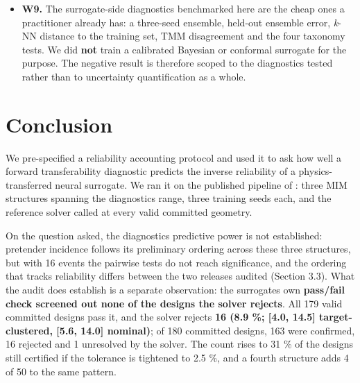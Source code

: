 \documentclass[11pt,a4paper]{article}
\newcounter{none}   %
\begin{document}
\begin{itemize}
  to the audit\textquotesingle s own truncation, though not, on this evidence, to its raster.
  The probe was not run on the as-submitted arm\textquotesingle s own (different) committed geometries, so how much of its 53.1 \% owes to truncation versus to its other differences (Section 3.10) is not established.
\item
  \textbf{W9.} The surrogate-side diagnostics benchmarked here are the cheap ones a
  practitioner already has: a three-seed ensemble, held-out ensemble error, \emph{k}-NN
  distance to the training set, TMM disagreement and the four taxonomy tests. We did
  \textbf{not} train a calibrated Bayesian or conformal surrogate for the purpose. The negative
  result is therefore scoped to the diagnostics tested rather than to uncertainty
  quantification as a whole.
\end{itemize}

\section{Conclusion}\label{sec:5}

We pre-specified a reliability accounting protocol and used it to ask how well a forward
transferability diagnostic predicts the inverse reliability of a physics-transferred neural
surrogate. We ran it on the published pipeline of \cite{choi20261}: three MIM structures spanning the
diagnostic\textquotesingle s range, three training seeds each, and the reference solver called at every
valid committed geometry.

On the question asked, the diagnostic\textquotesingle s predictive power is not established: pretender incidence follows its preliminary ordering across these three structures, but with 16 events the pairwise tests do not reach significance, and the ordering that tracks reliability differs between the two releases audited (Section 3.3). What the audit does establish is a separate observation: the surrogate\textquotesingle s own \textbf{pass/fail check screened out none of the designs the solver rejects}. All 179 valid committed designs pass it, and the solver rejects
\textbf{16 (8.9 \%; {[}4.0, 14.5{]} target-clustered, {[}5.6, 14.0{]} nominal)}; of 180 committed designs,
163 were confirmed, 16 rejected and 1 unresolved by the solver. The count rises to 31 \% of
the designs still certified if the tolerance is tightened to 2.5 \%, and a fourth structure
adds 4 of 50 to the same pattern.
\end{document}
